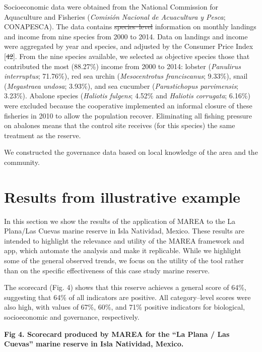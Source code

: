 \documentclass[12pt,]{article}
\providecommand{\DIFaddtex}[1]{{\protect\color{blue}\uwave{#1}}} %
\providecommand{\DIFdeltex}[1]{{\protect\color{red}\sout{#1}}}                      %
\providecommand{\DIFaddbegin}{} %
\providecommand{\DIFaddend}{} %
\providecommand{\DIFdelbegin}{} %
\providecommand{\DIFdelend}{} %
\providecommand{\DIFadd}[1]{\texorpdfstring{\DIFaddtex{#1}}{#1}} %
\providecommand{\DIFdel}[1]{\texorpdfstring{\DIFdeltex{#1}}{}} %
\newcommand{\DIFscaledelfig}{0.5}
\newlength{\DIFdelgraphicswidth} %
\newlength{\DIFdelgraphicsheight} %
\newcommand{\DIFaddincludegraphics}[2][]{{\color{blue}\fbox{\DIFOincludegraphics[#1]{#2}}}} %
\newcommand{\DIFdelincludegraphics}[2][]{%
\sbox{\DIFdelgraphicsbox}{\DIFOincludegraphics[#1]{#2}}%
\settoboxwidth{\DIFdelgraphicswidth}{\DIFdelgraphicsbox} %
\settoboxtotalheight{\DIFdelgraphicsheight}{\DIFdelgraphicsbox} %
\scalebox{\DIFscaledelfig}{%
\parbox[b]{\DIFdelgraphicswidth}{\usebox{\DIFdelgraphicsbox}\\[-\baselineskip] \rule{\DIFdelgraphicswidth}{0em}}\llap{\resizebox{\DIFdelgraphicswidth}{\DIFdelgraphicsheight}{%
\setlength{\unitlength}{\DIFdelgraphicswidth}%
\begin{picture}(1,1)%
\thicklines\linethickness{2pt} %
{\color[rgb]{1,0,0}\put(0,0){\framebox(1,1){}}}%
{\color[rgb]{1,0,0}\put(0,0){\line( 1,1){1}}}%
{\color[rgb]{1,0,0}\put(0,1){\line(1,-1){1}}}%
\end{picture}%
}\hspace*{3pt}}} %
} %
\DeclareRobustCommand{\DIFaddbegin}{\DIFOaddbegin \let\includegraphics\DIFaddincludegraphics} %
\DeclareRobustCommand{\DIFaddend}{\DIFOaddend \let\includegraphics\DIFOincludegraphics} %
\DeclareRobustCommand{\DIFdelbegin}{\DIFOdelbegin \let\includegraphics\DIFdelincludegraphics} %
\DeclareRobustCommand{\DIFdelend}{\DIFOaddend \let\includegraphics\DIFOincludegraphics} %
\begin{document}
Socioeconomic data were obtained from the National Commission for
Aquaculture and Fisheries (\emph{Comisión Nacional de Acuacultura y
Pesca}; CONAPESCA). The data contains \DIFdelbegin \DIFdel{species--level }\DIFdelend \DIFaddbegin \DIFadd{species-level }\DIFaddend information on
monthly landings and income from nine species from 2000 to 2014. Data on
landings and income were aggregated by year and species, and adjusted by
the Consumer Price Index {[}\DIFdelbegin \DIFdel{42}\DIFdelend \DIFaddbegin \DIFadd{48}\DIFaddend {]}. From the nine species available, we
selected as objective species those that contributed the most (88.27\%)
income from 2000 to 2014: lobster (\emph{Panulirus interruptus};
71.76\%), red sea urchin (\emph{Mesocentrotus franciscanus}; 9.33\%),
snail (\emph{Megastraea undosa}; 3.93\%), and sea cucumber
(\emph{Parastichopus parvimensis}; 3.23\%). Abalone species
(\emph{Haliotis fulgens}; 4.52\% and \emph{Haliotis corrugata}; 6.16\%)
were excluded because the cooperative implemented an informal closure of
these fisheries in 2010 to allow the population \DIFaddbegin \DIFadd{to }\DIFaddend recover. Eliminating
all fishing pressure on abalones means that the control site receives
(for this species) the same treatment as the reserve.

We constructed the governance data based on local knowledge of the area
and the community.

\section{Results from illustrative
example}\label{results-from-illustrative-example}

In this section we show the results of the application of MAREA to the
La Plana/Las Cuevas marine reserve in Isla Natividad, Mexico. These
results are intended to highlight the relevance and utility of the MAREA
framework and app, which automate the analysis and make it replicable.
While we highlight some of the general observed trends, we focus on the
utility of the tool rather than on the specific effectiveness of this
case study marine reserve.

The scorecard (Fig. 4) shows that this reserve achieves a general score
of 64\%, suggesting that 64\% of all indicators are positive. All
category--level scores were also high, with values of 67\%, 60\%, and
71\% positive indicators for biological, socioeconomic and governance,
respectively.

\textbf{Fig 4. Scorecard produced by MAREA for the ``La Plana / Las
Cuevas'' marine reserve in Isla Natividad, Mexico.}
\end{document}
